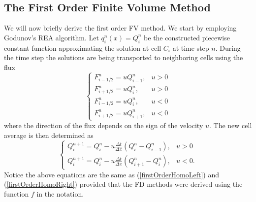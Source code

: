 \subsection{The First Order Finite Volume Method}
We will now briefly derive the first order FV method. We start by employing Godunov's REA algorithm. Let $q_i^n(x) = Q_i^n$ be the constructed piecewise constant function approximating the solution at cell $C_i$ at time step $n$. During the time step the solutions are being transported to neighboring cells using the flux
%
\begin{equation*}
\left\{
\begin{array}{cc}
F_{i-1/2}^n = u Q_{i-1}^n, & u>0\\
F_{i+1/2}^n = u Q_{i}^n, & u>0\\
F_{i-1/2}^n = u Q_{i}^n, & u<0\\
F_{i+1/2}^n = u Q_{i+1}^n, & u<0
\end{array}
\right.
\end{equation*}
%
where the direction of the flux depends on the sign of the velocity $u$. The new cell average is then determined as
%
\begin{equation}
\label{first_order_FV_method}
\left\{
\begin{array}{cc}
Q_i^{n+1} = Q_i^n - u \frac{\Delta t}{\Delta x} (Q_{i}^n - Q_{i-1}^n), & u>0\\
Q_i^{n+1} = Q_i^n - u \frac{\Delta t}{\Delta x} (Q_{i+1}^n - Q_{i}^n), & u<0.
\end{array}
\right.
\end{equation}
%
Notice the above equations are the same as (\ref{firstOrderHomoLeft}) and (\ref{firstOrderHomoRight}) provided that the FD methods were derived using the function $f$ in the notation.
